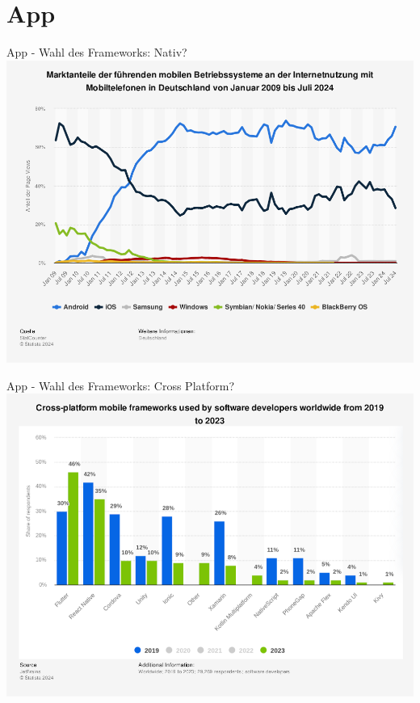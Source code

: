 %
%
\section{App}

\begin{frame}{App - Wahl des Frameworks: Nativ?}
	\centering
	\includegraphics[height=0.9\textheight]{images/app/flutter/statista_mobile.png}
	\cite{StatistaMobil}
\end{frame}

\begin{frame}{App - Wahl des Frameworks: Cross Platform?}
	\centering
	\includegraphics[height=0.9\textheight]{images/app/flutter/cross_platform_statista.png}
	\cite{StatistaCross}
\end{frame}

